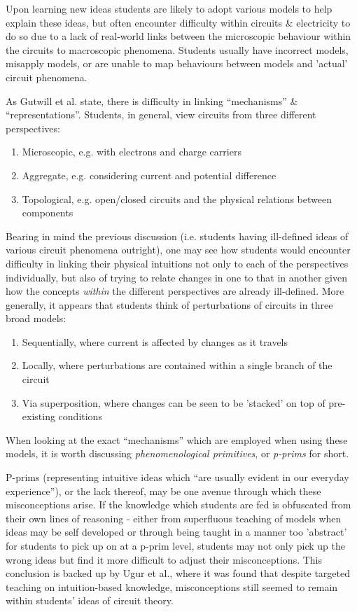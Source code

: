 \documentclass[a4paper,openany,nobib]{tufte-book}
\begin{document}
Upon learning new ideas students are likely to adopt various models to help explain these {ideas\autocite{bagno2000}}, but often encounter difficulty within circuits \& electricity to do so due to a lack of real-world links between the microscopic behaviour within the circuits to macroscopic phenomena. Students usually have incorrect models, misapply models, or are unable to map behaviours between models and 'actual' circuit phenomena.

As Gutwill et al. state, there is difficulty in linking ``mechanisms'' \& {``representations''\autocite{gutwill99}}.
Students, in general, view circuits from three different perspectives:
\begin{enumerate}
	\item Microscopic, e.g. with electrons and charge carriers
	\item Aggregate, e.g. considering current and potential difference
	\item Topological, e.g. open/closed circuits and the physical relations between components
\end{enumerate}
Bearing in mind the previous discussion (i.e. students having ill-defined ideas of various circuit phenomena outright), one may see how students would encounter difficulty in linking their physical intuitions not only to each of the perspectives individually, but also of trying to relate changes in one to that in another given how the concepts \emph{within} the different perspectives are already ill-defined. More generally, it appears that students think of perturbations of circuits in three broad {models\autocite{ates2005}}:
\begin{enumerate}
	\item Sequentially, where current is affected by changes as it travels
	\item Locally, where perturbations are contained within a single branch of the circuit
	\item Via superposition, where changes can be seen to be 'stacked' on top of pre-existing conditions
\end{enumerate}
When looking at the exact ``mechanisms'' which are employed when using these models, it is worth discussing \emph{phenomenological primitives}, or \emph{p-prims} for {short\autocite{prim}}. 

P-prims (representing intuitive ideas which ``are usually evident in our everyday experience''), or the lack thereof, may be one avenue through which these misconceptions arise. If the knowledge which students are fed is obfuscated from their own lines of reasoning - either from superfluous teaching of models when ideas may be self developed or through being taught in a manner too 'abstract' for students to pick up on at a p-prim level, students may not only pick up the wrong ideas but find it more difficult to adjust their misconceptions. 
This conclusion is backed up by Ugur et {al.\autocite{ugur}}, where it was found that despite targeted teaching on intuition-based knowledge, misconceptions still seemed to remain within students' ideas of circuit theory.
\end{document}
